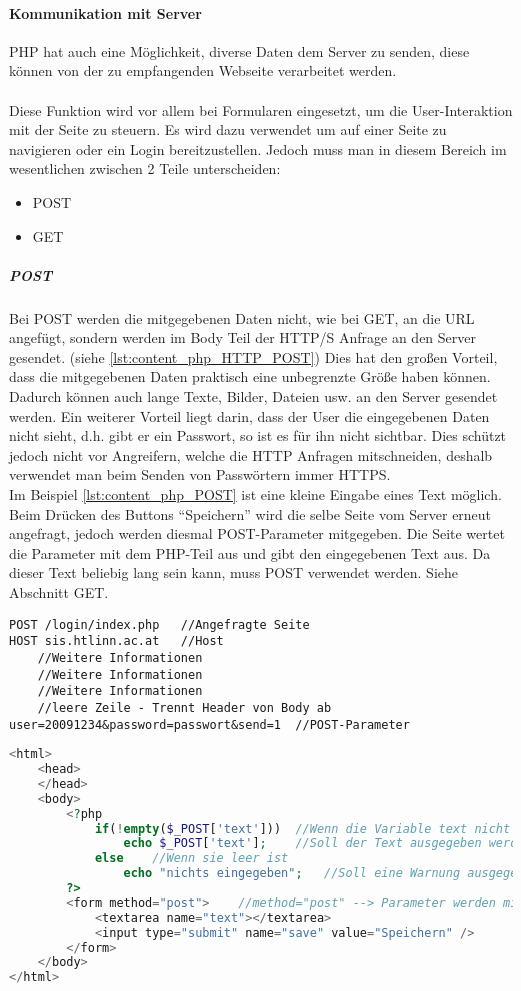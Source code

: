 \paragraph{Kommunikation mit Server}
PHP hat auch eine Möglichkeit, diverse Daten dem Server zu 
senden, diese können von der zu empfangenden Webseite verarbeitet werden.\\\\
Diese Funktion wird vor allem bei Formularen eingesetzt, um die User-Interaktion mit der Seite zu steuern. Es wird dazu verwendet um auf einer Seite zu navigieren oder ein Login bereitzustellen. Jedoch muss man in diesem Bereich im wesentlichen zwischen 2 Teile unterscheiden:
\begin{itemize}
    \item POST
    \item GET
\end{itemize}
\subparagraph{POST\\}
Bei POST werden die mitgegebenen Daten nicht, wie bei GET, an die URL angefügt, sondern werden im Body Teil der HTTP/S Anfrage an den Server gesendet. (siehe \autoref{lst:content_php_HTTP_POST}) Dies hat den großen Vorteil, dass die mitgegebenen Daten praktisch eine unbegrenzte Größe haben können. Dadurch können auch lange Texte, Bilder, Dateien usw. an den Server gesendet werden. Ein weiterer Vorteil liegt darin, dass der User die eingegebenen Daten nicht sieht, d.h. gibt er ein Passwort, so ist es für ihn nicht sichtbar. Dies schützt jedoch nicht vor Angreifern, welche die HTTP Anfragen mitschneiden, deshalb verwendet man beim Senden von Passwörtern immer HTTPS.\\
Im Beispiel \autoref{lst:content_php_POST} ist eine kleine Eingabe eines Text möglich. Beim Drücken des Buttons \enquote{Speichern} wird die selbe Seite vom Server erneut angefragt, jedoch werden diesmal POST-Parameter mitgegeben. Die Seite wertet die Parameter mit dem PHP-Teil aus und gibt den eingegebenen Text aus. Da dieser Text beliebig lang sein kann, muss POST verwendet werden. Siehe Abschnitt GET.
\begin{lstlisting}[style=custom, caption={Ausschnitt HTTP POST Request},label={lst:content_php_HTTP_POST}]
POST /login/index.php	//Angefragte Seite
HOST sis.htlinn.ac.at	//Host
	//Weitere Informationen
	//Weitere Informationen
	//Weitere Informationen
	//leere Zeile - Trennt Header von Body ab
user=20091234&password=passwort&send=1	//POST-Parameter
\end{lstlisting}
\begin{lstlisting}[style=custom, language=PHP, caption={Beispiel POST},label={lst:content_php_POST}]
<html>
	<head>
	</head>
	<body>
		<?php
			if(!empty($_POST['text']))	//Wenn die Variable text nicht leer ist
				echo $_POST['text'];	//Soll der Text ausgegeben werden
			else	//Wenn sie leer ist
				echo "nichts eingegeben";	//Soll eine Warnung ausgegeben werden
		?>
		<form method="post">	//method="post" --> Parameter werden mit POST mitgegeben
			<textarea name="text"></textarea>
			<input type="submit" name="save" value="Speichern" />
		</form>
	</body>
</html>
\end{lstlisting}
